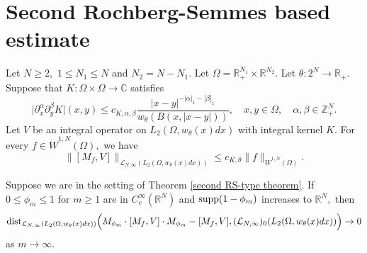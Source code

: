 \documentclass{amsart}
\begin{document}
\section{Second Rochberg-Semmes based estimate}

\begin{theorem}\label{second RS-type theorem} Let $N\geq 2,$ $1\leq N_1\leq N$ and $N_2=N-N_1.$ Let $\Omega=\mathbb{R}^{N_1}_+\times\mathbb{R}^{N_2}.$ Let $\theta:2^N\to\mathbb{R}_+.$ Suppose that $K:\Omega\times\Omega\to\mathbb{C}$
satisfies
$$\bigl|\partial_x^{\alpha}\partial_y^{\beta}K\bigr|(x,y)\leq c_{K,\alpha,\beta}\frac{|x-y|^{-|\alpha|_1-|\beta|_1}}{w_{\theta}(B(x,|x-y|))},\quad x,y\in\Omega,\quad\alpha,\beta\in\mathbb{Z}^N_+.$$
Let $V$ be an integral operator on $L_2(\Omega,w_{\theta}(x)dx)$ with integral kernel $K.$ For every $f\in\dot{W}^{1,N}(\Omega),$ we have
$$\|[M_f,V]\|_{\mathcal{L}_{N,\infty}(L_2(\Omega,w_{\theta}(x)dx))}\leq c_{K,\theta}\|f\|_{\dot{W}^{1,N}(\Omega)}.$$
\end{theorem}

\begin{theorem}\label{second RS-type convergence} Suppose we are in the setting of Theorem \ref{second RS-type theorem}. If $0\leq\phi_m\leq 1$ for $m\geq1$ are in $C^{\infty}_c(\mathbb{R}^N)$ and ${\rm supp}(1-\phi_m)$ increases to $\mathbb{R}^N,$ then
$${\rm dist}_{\mathcal{L}_{N,\infty}(L_2(\Omega,w_{\theta}(x)dx))}\Big(M_{\phi_m}\cdot [M_f,V]\cdot M_{\phi_m}- [M_f,V],(\mathcal{L}_{N,\infty})_0(L_2(\Omega,w_{\theta}(x)dx))\Big)\to0$$
as $m\to\infty.$
\end{theorem}
\end{document}
